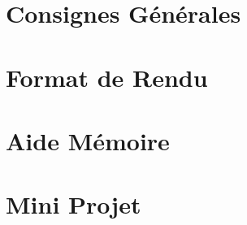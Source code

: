\documentclass[12pt,a4paper]{article}
\begin{document}
\maketitle





\newpage

\tableofcontents

\newpage

\section{Consignes Générales}

\bigskip



\newpage

\section{Format de Rendu}
\label{sec:FormatDeRendu}

\vspace*{1cm}



\newpage

\section{Aide Mémoire}
\label{sec:AideMemoire}

\vspace*{1cm}




\newpage


\section{Mini Projet}

\vspace*{0.7cm}



\newpage
\end{document}
